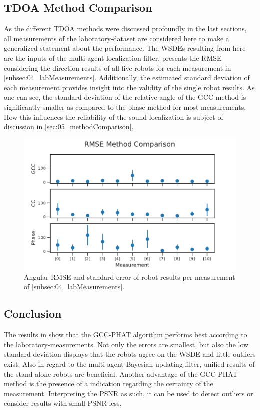 \subsection{\ac{TDOA} Method Comparison}
\label{subsec:04_singleRobotAngleError}

As the different \ac{TDOA} methods were discussed profoundly in the last
sections, all measurements of the laboratory-dataset are considered here
to make a generalized statement about the performance.
The \acp{WSDE} resulting from here are the inputs of the multi-agent
localization filter.
 presents the \ac{RMSE} considering the
direction results of all five robots for each measurement in
\cref{subsec:04_labMeasurements}.
Additionally, the estimated standard deviation of each measurement
provides insight into the validity of the single robot results.
As one can see, the standard deviation of the relative angle of the \ac{GCC}
method is significantly smaller as compared to the phase method for most
measurements.
How this influences the reliability of the sound localization is
subject of discussion in \cref{sec:05_methodComparison}.
\begin{figure}[ht]
	\centering
		\includegraphics[]{figures/evaluation/compare_rmse}
	\caption{Angular RMSE and standard error of robot results per
	measurement of \cref{subsec:04_labMeasurements}.}
    \label{fig:04_compareRmse}
\end{figure}

\subsection{Conclusion}
\label{subsec:04_tdoaConclusion}

The results in  show
that the \ac{GCC-PHAT} algorithm performs best according to the
laboratory-measurements.
Not only the errors are smallest, but also the low standard deviation
displays that the robots agree on the \ac{WSDE} and little outliers exist.
Also in regard to the multi-agent Bayesian updating filter, unified
results of the stand-alone robots are beneficial.
Another advantage of the \ac{GCC-PHAT} method is the presence of
a indication regarding the certainty of the measurement.
Interpreting the \ac{PSNR} as such, it can be used to detect outliers
or consider results with small \ac{PSNR} less.